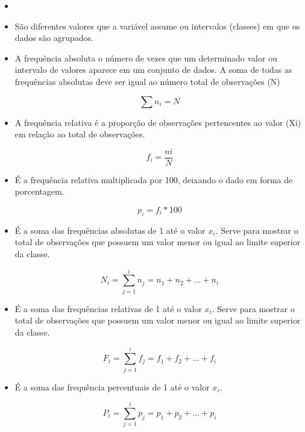 \documentclass[a4paper,11pt]{article}
\begin{document}
\begin{itemize}
\item[]

    \item São diferentes valores que  a variável assume ou intervalos (classes) em que os dados são agrupados.

    \item A frequência absoluta o número de vezes que um determinado valor ou intervalo de valores aparece em um conjunto de dados. A soma de todas as frequências absolutas deve ser igual ao número total de observações (N)

    \[\sum n_i = N\]

    \item A frequência relativa é a proporção de observações pertencentes ao valor (Xi) em relação ao total de observações.

    \[f_i = \frac{ni}{N}\]

    \item É a frequência relativa multiplicada por 100, deixando o dado em forma de porcentagem.

    \[p_i = f_i * 100\]

    \item É a soma das frequências absolutas de 1 até o valor $x_i$. Serve para mostrar o total de observações que possuem um valor menor ou igual ao limite superior da classe.

    \[N_i = \sum_{j=1}^{i} n_j = n_1 + n_2 + ... + n_i\]

    \item É a soma das frequências relativas de 1 até o valor $x_i$. Serve para mostrar o total de observações que possuem um valor menor ou igual ao limite superior da classe.

    \[F_i = \sum_{j=1}^{i} f_j = f_1 + f_2 + ... + f_i\]

    \item É a soma das frequência percentuais de 1 até o valor $x_i$.

    \[P_i = \sum_{j=1}^{i} p_j = p_1 + p_2 + ... + p_i\]

\end{itemize}
\end{document}
